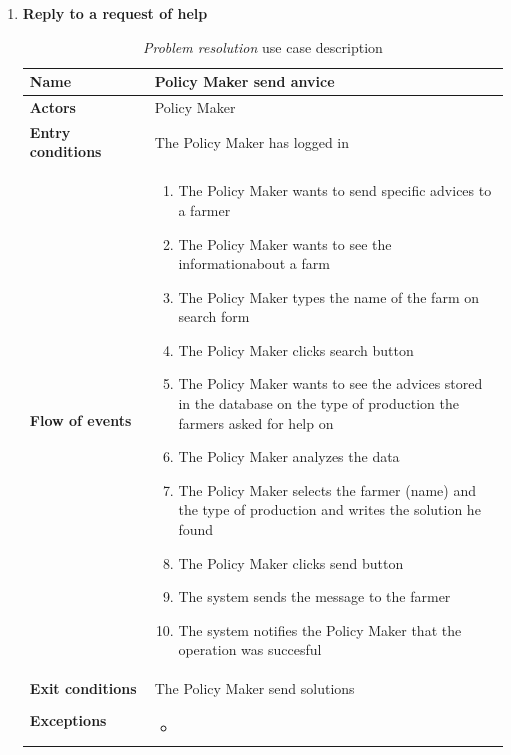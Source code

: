 \begin{enumerate}
    \item \textbf{Reply to a request of help}
    \begin{longtable}{p{0.26\linewidth}p{0.75\linewidth}}
        \toprule
        \textbf{Name} & \textbf{Policy Maker send anvice} \\
        \midrule
        \textbf{Actors} & Policy Maker \\
        \midrule
        \textbf{Entry conditions} & The Policy Maker has logged in\\
        \midrule
        \textbf{Flow of events} & 
        \begin{enumerate}
            \item The Policy Maker wants to send specific advices to a farmer
            \item The Policy Maker wants to see the informationabout a farm
            \item The Policy Maker types the name of the farm on search form
            \item The Policy Maker clicks search button 
            \item The Policy Maker wants to see the advices stored in the database on the type of production the farmers asked for help on
            \item The Policy Maker analyzes the data 
            \item The Policy Maker selects the farmer (name) and the type of production and writes the solution he found
            \item The Policy Maker clicks send button
            \item The system sends the message to the farmer
            \item The system notifies the Policy Maker that the operation was succesful
        \end{enumerate} \\
        \midrule
        \textbf{Exit conditions} & The Policy Maker send solutions\\
        \midrule
        \textbf{Exceptions} & 
        \begin{itemize}
            \item 
        \end{itemize}\\
        \bottomrule
        \caption{\emph{Problem resolution} use case description}
    \end{longtable}


\end{enumerate}
